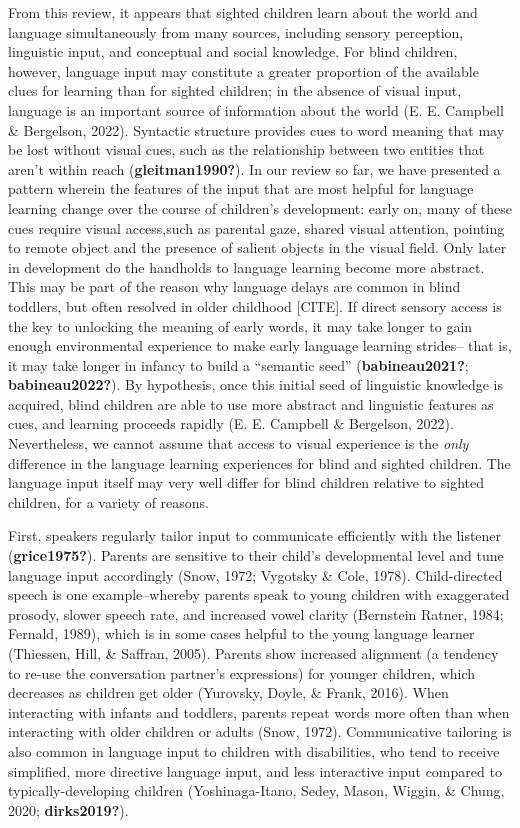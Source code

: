 \documentclass[
  man,floatsintext]{apa6}
\begin{document}
From this review, it appears that sighted children learn about the world and language simultaneously from many sources, including sensory perception, linguistic input, and conceptual and social knowledge. For blind children, however, language input may constitute a greater proportion of the available clues for learning than for sighted children; in the absence of visual input, language is an important source of information about the world (E. E. Campbell \& Bergelson, 2022). Syntactic structure provides cues to word meaning that may be lost without visual cues, such as the relationship between two entities that aren't within reach (\textbf{gleitman1990?}). In our review so far, we have presented a pattern wherein the features of the input that are most helpful for language learning change over the course of children's development: early on, many of these cues require visual access,such as parental gaze, shared visual attention, pointing to remote object and the presence of salient objects in the visual field. Only later in development do the handholds to language learning become more abstract. This may be part of the reason why language delays are common in blind toddlers, but often resolved in older childhood {[}CITE{]}. If direct sensory access is the key to unlocking the meaning of early words, it may take longer to gain enough environmental experience to make early language learning strides-- that is, it may take longer in infancy to build a ``semantic seed'' (\textbf{babineau2021?}; \textbf{babineau2022?}). By hypothesis, once this initial seed of linguistic knowledge is acquired, blind children are able to use more abstract and linguistic features as cues, and learning proceeds rapidly (E. E. Campbell \& Bergelson, 2022). Nevertheless, we cannot assume that access to visual experience is the \emph{only} difference in the language learning experiences for blind and sighted children. The language input itself may very well differ for blind children relative to sighted children, for a variety of reasons.

First, speakers regularly tailor input to communicate efficiently with the listener (\textbf{grice1975?}). Parents are sensitive to their child's developmental level and tune language input accordingly (Snow, 1972; Vygotsky \& Cole, 1978). Child-directed speech is one example--whereby parents speak to young children with exaggerated prosody, slower speech rate, and increased vowel clarity (Bernstein Ratner, 1984; Fernald, 1989), which is in some cases helpful to the young language learner (Thiessen, Hill, \& Saffran, 2005). Parents show increased alignment (a tendency to re-use the conversation partner's expressions) for younger children, which decreases as children get older (Yurovsky, Doyle, \& Frank, 2016). When interacting with infants and toddlers, parents repeat words more often than when interacting with older children or adults (Snow, 1972). Communicative tailoring is also common in language input to children with disabilities, who tend to receive simplified, more directive language input, and less interactive input compared to typically-developing children (Yoshinaga-Itano, Sedey, Mason, Wiggin, \& Chung, 2020; \textbf{dirks2019?}).
\end{document}
